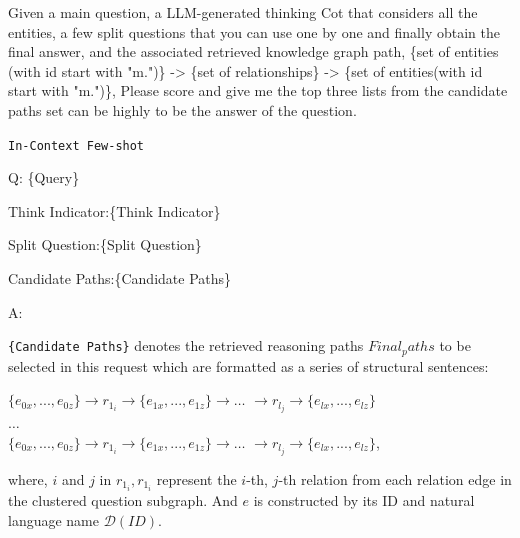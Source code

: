 \begin{center}
    
\begin{minipage}{0.7\columnwidth}
    \centering
    \vspace{2mm}
    
    \begin{tcolorbox}[title=Precise Path Select Prompt Template]
        \small
Given a main question, a LLM-generated thinking Cot that considers all the entities, a few split questions that you can use one by one and finally obtain the final answer, and the associated retrieved knowledge graph path, \{set of entities (with id start with "m.")\} -> \{set of relationships\} -> \{set of entities(with id start with "m.")\}, 
Please score and give me the top three lists from the candidate paths set can be highly to be the answer of the question.

\vspace{5pt}
    
\texttt{In-Context Few-shot}

\vspace{5pt}
Q: \{Query\} 

Think Indicator:\{Think Indicator\}

Split Question:\{Split Question\}

Candidate Paths:\{Candidate Paths\}

A: 
\end{tcolorbox}
\vspace{2mm}
\end{minipage}
\end{center}
\texttt{\{Candidate Paths\}} denotes the retrieved reasoning paths $Final_paths$ to be selected in this request which are formatted as a series of structural sentences:

\begin{minipage}{0.99\columnwidth}
    \centering
    $\{e_{0x},...,e_{0z}\}\to r_{1_i} \to \{e_{1x},...,e_{1z}\}\to \dots$ $\to r_{l_j} \to \{e_{lx},...,e_{lz}\}$ 
    \\ $\dots$\\
    $\{e_{0x},...,e_{0z}\}\to r_{1_i} \to \{e_{1x},...,e_{1z}\}\to \dots$ $\to r_{l_j} \to \{e_{lx},...,e_{lz}\}$,
    
\end{minipage}

\noindent where, $i$ and $j$ in $r_{1_i}, r_{1_i}$ represent the $i$-th, $j$-th relation from each relation edge in the clustered question subgraph.
And $e$ is constructed by its ID and natural language name $\mathcal{D}(ID)$.
\vspace{5pt}

